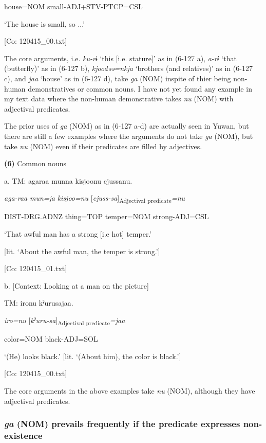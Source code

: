       house=NOM  small-ADJ+STV-PTCP=CSL

      ‘The house is small, so ...’

      [Co: 120415\_00.txt]

The core arguments, i.e. \textit{ku-rɨ} ‘this [i.e. stature]’ as in (6-127 a), \textit{a-rɨ} ‘that (butterfly)’ as in (6-127 b), \textit{kjoodəə=nkja} ‘brothers (and relatives)’ as in (6-127 c), and \textit{jaa} ‘house’ as in (6-127 d), take \textit{ga} (NOM) inspite of thier being non-human demonstratives or common nouns. I have not yet found any example in my text data where the non-human demonstrative takes \textit{nu} (NOM) with adjectival predicates.

The prior uses of \textit{ga} (NOM) as in (6-127 a-d) are actually seen in Yuwan, but there are still a few examples where the arguments do not take \textit{ga} (NOM), but take \textit{nu} (NOM) even if their predicates are filled by adjectives.

\textbf{(6)}  Common nouns

  a.  TM:  agaraa  munna  kisjoonu  cjussanu.

      \textit{aga-raa}  \textit{mun=ja}  \textit{kisjoo=nu}  [\textit{cjuss-sa}]\textsubscript{Adjectival predicate}\textit{=nu}

      DIST-DRG.ADNZ  thing=TOP  temper=NOM  strong-ADJ=CSL

      ‘That awful man has a strong [i.e hot] temper.’

[lit. ‘About the awful man, the temper is strong.’]

      [Co: 120415\_01.txt]

  b.  [Context: Looking at a man on the picture]

    TM:  {\textbar}iro{\textbar}nu  kˀurusajaa.

      \textit{iro=nu}  [\textit{kˀuru-sa}]\textsubscript{Adjectival predicate}\textit{=jaa}

      color=NOM  black-ADJ=SOL

      ‘(He) looks black.’ [lit. ‘(About him), the color is black.’]

      [Co: 120415\_00.txt]

The core arguments in the above examples take \textit{nu} (NOM), although they have adjectival predicates.

\subsubsection{\textit{ga} (NOM) prevails frequently if the predicate expresses non-existence}

